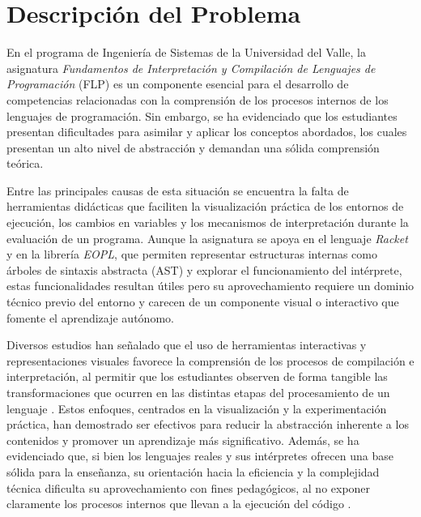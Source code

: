 \section{Descripción del Problema}

En el programa de Ingeniería de Sistemas de la Universidad del Valle, la asignatura \textit{Fundamentos de Interpretación y Compilación de Lenguajes de Programación} (FLP) es un componente esencial para el desarrollo de competencias relacionadas con la comprensión de los procesos internos de los lenguajes de programación. Sin embargo, se ha evidenciado que los estudiantes presentan dificultades para asimilar y aplicar los conceptos abordados, los cuales presentan un alto nivel de abstracción y demandan una sólida comprensión teórica.

Entre las principales causas de esta situación se encuentra la falta de herramientas didácticas que faciliten la visualización práctica de los entornos de ejecución, los cambios en variables y los mecanismos de interpretación durante la evaluación de un programa. Aunque la asignatura se apoya en el lenguaje \textit{Racket} y en la librería \textit{EOPL}, que permiten representar estructuras internas como árboles de sintaxis abstracta (AST) y explorar el funcionamiento del intérprete, estas funcionalidades resultan útiles pero su aprovechamiento requiere un dominio técnico previo del entorno y carecen de un componente visual o interactivo que fomente el aprendizaje autónomo.

Diversos estudios han señalado que el uso de herramientas interactivas y representaciones visuales favorece la comprensión de los procesos de compilación e interpretación, al permitir que los estudiantes observen de forma tangible las transformaciones que ocurren en las distintas etapas del procesamiento de un lenguaje \cite{Stamenković2024AWE, Kundra2016AnER}. Estos enfoques, centrados en la visualización y la experimentación práctica, han demostrado ser efectivos para reducir la abstracción inherente a los contenidos y promover un aprendizaje más significativo. Además, se ha evidenciado que, si bien los lenguajes reales y sus intérpretes ofrecen una base sólida para la enseñanza, su orientación hacia la eficiencia y la complejidad técnica dificulta su aprovechamiento con fines pedagógicos, al no exponer claramente los procesos internos que llevan a la ejecución del código \cite{Spigariol2023Aprendiendo}.


